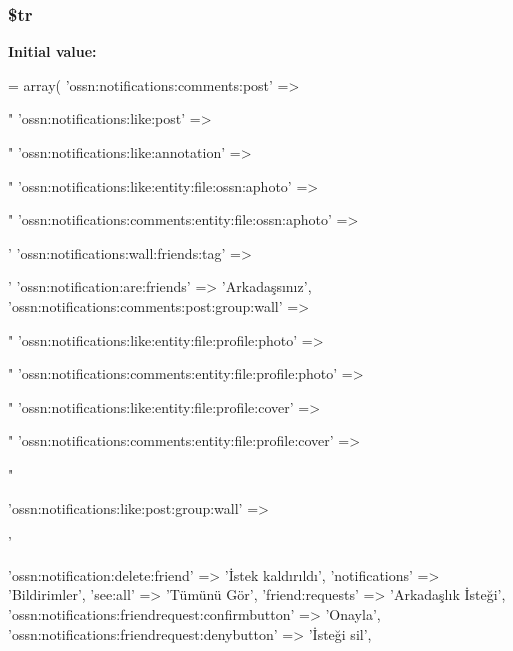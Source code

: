 \subsubsection[{\texorpdfstring{\$tr}{$tr}}]{\setlength{\rightskip}{0pt plus 5cm}\$tr}\hypertarget{components_2_ossn_notifications_2locale_2ossn_8tr_8php_a925f466a276b200c71b2567d39b4dba7}{}\label{components_2_ossn_notifications_2locale_2ossn_8tr_8php_a925f466a276b200c71b2567d39b4dba7}
{\bfseries Initial value\+:}
\begin{DoxyCode}
= array(
    \textcolor{stringliteral}{'ossn:notifications:comments:post'} => \textcolor{stringliteral}{"%
    \textcolor{stringliteral}{'ossn:notifications:like:post'} => \textcolor{stringliteral}{"%
    \textcolor{stringliteral}{'ossn:notifications:like:annotation'} => \textcolor{stringliteral}{"%
    \textcolor{stringliteral}{'ossn:notifications:like:entity:file:ossn:aphoto'} => \textcolor{stringliteral}{"%
    \textcolor{stringliteral}{'ossn:notifications:comments:entity:file:ossn:aphoto'} => \textcolor{stringliteral}{'%
    \textcolor{stringliteral}{'ossn:notifications:wall:friends:tag'} => \textcolor{stringliteral}{'%
    \textcolor{stringliteral}{'ossn:notification:are:friends'} => \textcolor{stringliteral}{'Arkadaşsınız'},
    \textcolor{stringliteral}{'ossn:notifications:comments:post:group:wall'} => \textcolor{stringliteral}{"%
    \textcolor{stringliteral}{'ossn:notifications:like:entity:file:profile:photo'} => \textcolor{stringliteral}{"%
    \textcolor{stringliteral}{'ossn:notifications:comments:entity:file:profile:photo'} => \textcolor{stringliteral}{"%
    \textcolor{stringliteral}{'ossn:notifications:like:entity:file:profile:cover'} => \textcolor{stringliteral}{"%
    \textcolor{stringliteral}{'ossn:notifications:comments:entity:file:profile:cover'} => \textcolor{stringliteral}{"%

    \textcolor{stringliteral}{'ossn:notifications:like:post:group:wall'} => \textcolor{stringliteral}{'%
    
    \textcolor{stringliteral}{'ossn:notification:delete:friend'} => \textcolor{stringliteral}{'İstek kaldırıldı'},
    \textcolor{stringliteral}{'notifications'} => \textcolor{stringliteral}{'Bildirimler'},
    \textcolor{stringliteral}{'see:all'} => \textcolor{stringliteral}{'Tümünü Gör'},
    \textcolor{stringliteral}{'friend:requests'} => \textcolor{stringliteral}{'Arkadaşlık İsteği'},
    \textcolor{stringliteral}{'ossn:notifications:friendrequest:confirmbutton'} => \textcolor{stringliteral}{'Onayla'},
    \textcolor{stringliteral}{'ossn:notifications:friendrequest:denybutton'} => \textcolor{stringliteral}{'İsteği sil'},
    
}}}}}}}}}}}}
\end{DoxyCode}
